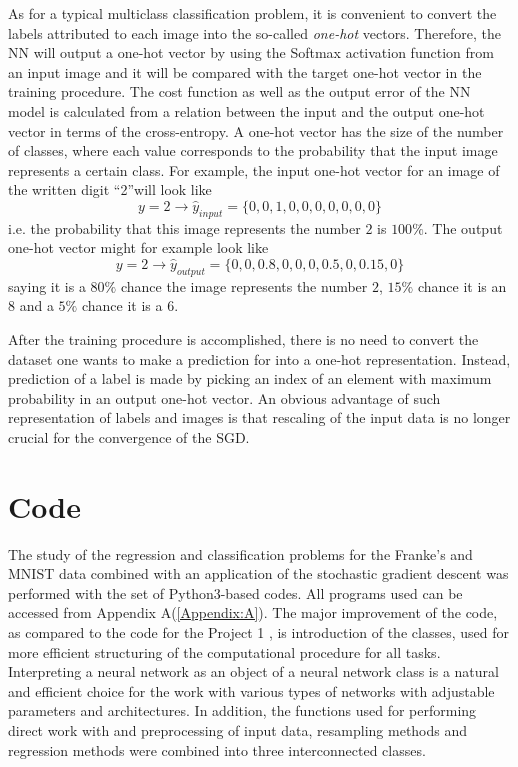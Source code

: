 \documentclass{emulateapj}
\begin{document}
As for a typical multiclass classification problem, it is convenient to convert the labels attributed to each image into the so-called \textit{one-hot} vectors. 
Therefore, the NN will output a one-hot vector by using the Softmax activation function from an input image and it will be compared with the target one-hot vector in the training procedure. The cost function as well as the output error of the NN model is calculated from a relation between the input and the output one-hot vector in terms of the cross-entropy. A one-hot vector has the size of the number of classes, where each value corresponds to the probability that the input image represents a certain class. For example, the input one-hot vector for an image of the written digit \textquotedblleft 2\textquotedblright will  look like 
\begin{equation}
y=2 \rightarrow \hat{y}_{input} = \{0,0,1,0,0,0,0,0,0,0\}
\end{equation}
i.e. the probability that this image represents the number $2$ is $100\%$. The output one-hot vector might for example look like 
\begin{equation}
y=2 \rightarrow \hat{y}_{output} = \{0,0,0.8,0,0,0,0.5,0,0.15,0\}    
\end{equation}
saying it is a $80\%$ chance the image represents the number $2$, $15\%$ chance it is an $8$ and a $5\%$ chance it is a $6$.

After the training procedure is accomplished, there is no need to convert the dataset one wants to make a prediction for into a one-hot representation. Instead, prediction of a label is made by picking an index of an element with maximum probability in an output one-hot vector. An obvious advantage of such representation of labels and images is that rescaling of the input data is no longer crucial for the convergence of the SGD.

\section{Code} \label{sec: Code}

The study of the regression and classification problems for the Franke's and MNIST data combined with an application of the stochastic gradient descent was performed with the set of Python3-based codes. All programs used can be accessed from Appendix A(\ref{Appendix:A}). The major improvement of the code, as compared to the code for the Project 1 \cite{proj1,proj1_2}, is introduction of the classes, used for more efficient structuring of the computational procedure for all tasks. Interpreting a neural network as an object of a neural network class is a natural and efficient choice for the work with various types of networks with adjustable parameters and architectures. In addition, the functions used for performing direct work with and preprocessing of input data, resampling methods and regression methods were combined into three interconnected classes. 
\end{document}
